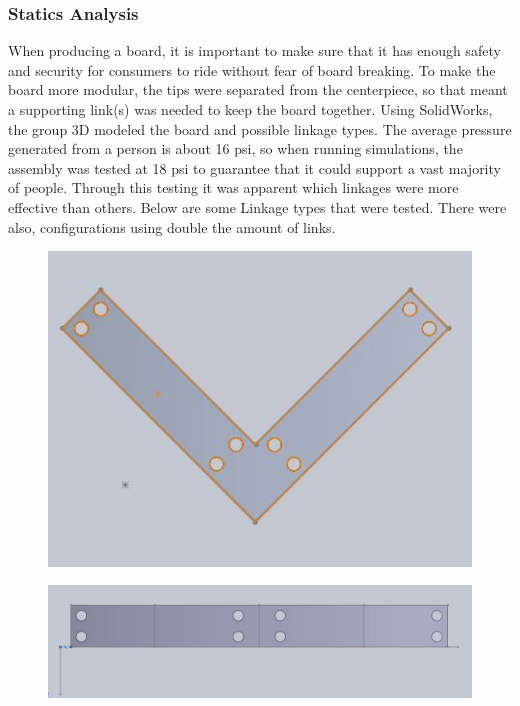\documentclass[letterpaper,12pt]{article}
\begin{document}
\subsubsection{Statics Analysis}
When producing a board, it is important to make sure that it has enough safety and security for consumers to ride without fear of board breaking. To make the board more modular, the tips were separated from the centerpiece, so that meant a supporting link(s) was needed to keep the board together. Using SolidWorks, the group 3D modeled the board and possible linkage types. The average pressure generated from a person is about 16 psi, so when running simulations, the assembly was tested at 18 psi to guarantee that it could support a vast majority of people. Through this testing it was apparent which linkages were more effective than others. 
\newline
Below are some Linkage types that were tested. There were also, configurations using double the amount of links.

\begin{figure}[!htbp]\centering
\begin{minipage}{.5\textwidth}\centering
\includegraphics[width=.8\textwidth]{single-v.JPG}
\label{singlev}
\end{minipage}
\end{figure}

\begin{figure}[!htbp]\centering
\begin{minipage}{.5\textwidth}\centering
\includegraphics[width=.8\textwidth]{single-bar.JPG}
\label{singlebar}
\end{minipage}
\end{figure}
\end{document}
